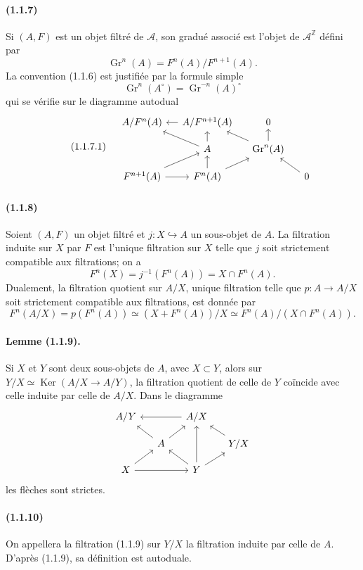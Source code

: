 \documentclass[10pt]{article}
\newcommand{\Z}{\mathbb Z}
\newcommand{\Gr}{\operatorname{Gr}}
\newcommand{\Ker}{\operatorname{Ker}}
\newcommand{\calA}{\mathcal A}
\begin{document}
\paragraph{(1.1.7)} Si $(A,F)$ est un objet filtré de $\calA$, son gradué associé est l'objet de $\calA^{\Z}$ défini par
\[
\Gr^n(A)=F^n(A)/F^{n+1}(A).
\]
La convention (1.1.6) est justifiée par la formule simple
\[
\Gr^n(A^{\circ})=\Gr^{-n}(A)^{\circ}
\]
qui se vérifie sur le diagramme autodual
\begin{equation}\tag{1.1.7.1}
\begin{tikzcd}[column sep=1.2em,row sep=1.0em]
& A/F^n(A) & A/F^{n+1}(A) \arrow[l] & 0 \\
& & A \arrow[ul] \arrow[u] & \Gr^n(A) \arrow[ul] \arrow[u] \\
& F^{n+1}(A) \arrow[r] \arrow[ur] & F^n(A) \arrow[u] \arrow[ur] & & 0 \arrow[ul]
\end{tikzcd}
\end{equation}

\paragraph{(1.1.8)} Soient $(A,F)$ un objet filtré et $j:X\hookrightarrow A$ un sous-objet de $A$. La filtration induite sur $X$ par $F$ est l'unique filtration sur $X$ telle que $j$ soit strictement compatible aux filtrations; on a
\[
F^n(X)=j^{-1}(F^n(A))=X\cap F^n(A).
\]
Dualement, la filtration quotient sur $A/X$, unique filtration telle que $p:A\to A/X$ soit strictement compatible aux filtrations, est donnée par
\[
F^n(A/X)=p(F^n(A))\simeq (X+F^n(A))/X\simeq F^n(A)/(X\cap F^n(A)).
\]

\paragraph{Lemme (1.1.9).} Si $X$ et $Y$ sont deux sous-objets de $A$, avec $X\subset Y$, alors sur $Y/X\simeq\Ker(A/X\to A/Y)$, la filtration quotient de celle de $Y$ coïncide avec celle induite par celle de $A/X$. Dans le diagramme
\[
\begin{tikzcd}[column sep=1.3em,row sep=1.0em]
A/Y && A/X \arrow[ll] & \\
& A \arrow[ul] \arrow[ur] && Y/X \arrow[ul] \\
X \arrow[ur] \arrow[rr] && Y \arrow[ul] \arrow[uu] \arrow[ur] &
\end{tikzcd}
\]
les flèches sont strictes.

\paragraph{(1.1.10)} On appellera la filtration (1.1.9) sur $Y/X$ la filtration induite par celle de $A$. D'après (1.1.9), sa définition est autoduale.
\end{document}
